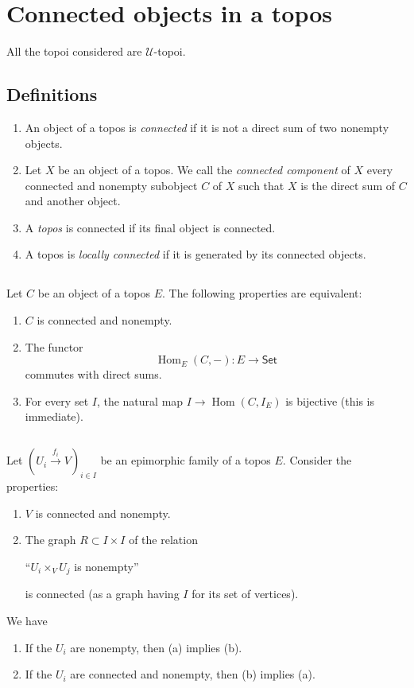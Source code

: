 \documentclass[10pt]{amsart}
\newcommand{\cal}{\mathcal}
\newcommand{\cat}{\mathsf}
\DeclareMathOperator{\Hom}{Hom}
\begin{document}
\section{Connected objects in a topos}

All the topoi considered are $\cal{U}$-topoi.

\subsection{Definitions}
\begin{enumerate}[label=(\alph*)]
  \item An object of a topos is \emph{connected} if it is not a direct sum of two nonempty objects.
  \item Let $X$ be an object of a topos.
    We call the \emph{connected component} of $X$ every connected and nonempty subobject $C$ of $X$ such that $X$ is the direct sum of $C$ and another object.
  \item A \emph{topos} is connected if its final object is connected.
  \item A topos is \emph{locally connected} if it is generated by its connected objects.
\end{enumerate}

\subsection{}
Let $C$ be an object of a topos $E$.
The following properties are equivalent:
\begin{enumerate}[label=(\alph*)]
  \item $C$ is connected and nonempty.
  \item The functor
    \[
      \Hom_E(C,-):E\longrightarrow\cat{Set}
    \]
    commutes with direct sums.
  \item For every set $I$, the natural map $I\to\Hom(C,I_E)$ is bijective (this is immediate).
\end{enumerate}

\subsection{}
Let $(U_i\xrightarrow{f_i}V)_{i\in I}$ be an epimorphic family of a topos $E$.
Consider the properties:
\begin{enumerate}[label=(\alph*)]
  \item $V$ is connected and nonempty.
  \item The graph $R\subset I\times I$ of the relation
    \begin{center}
    ``$U_i\times_V U_j$ is nonempty''
    \end{center}
    is connected (as a graph having $I$ for its set of vertices).
\end{enumerate}
We have
\begin{enumerate}[label=(\roman*)]
  \item If the $U_i$ are nonempty, then (a) implies (b).
  \item If the $U_i$ are connected and nonempty, then (b) implies (a).
\end{enumerate}
\end{document}
